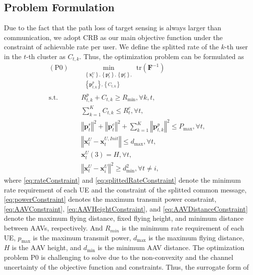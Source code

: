 \documentclass[twocolumn,journal]{IEEEtran}
\begin{document}
\subsection{Problem Formulation}
Due to the fact that the path loss of target sensing is always larger than communication, we adopt CRB as our main objective function under the constraint of achievable rate per user. We define the splitted rate of the \(k\)-th user in the \(t\)-th cluster as \(C_{t,k}\). Thus, the optimization problem can be formulated as
\begin{subequations}
\begin{align}
 (\text{P0})\quad&\min_{
 \substack{\left\{\boldsymbol{x}^{U}_{t}\right\},\left\{\boldsymbol{p}^{r}_{t}\right\},\left\{\boldsymbol{p}^{c}_{t}\right\},\\
 \left\{\boldsymbol{p}^{p}_{t,k}\right\},\left\{C_{t,k}
 \right\}}
 } \text{tr}(\mathbf{F}^{-1})\label{eq:obj}\\
 \text{s.t.}\quad& R^{p}_{t,k} + C_{t,k} \geq R_{\min}, \forall k,t,\label{eq:rateConstraint}\\
    & \sum_{k=1}^{K} C_{t,k} \leq R^{c}_{t}, \forall t, \label{eq:splittedRateConstraint}\\
    & \left\Vert\boldsymbol{p}^{r}_{t}\right\Vert^2 + \left\Vert \boldsymbol{p}^{c}_{t}\right\Vert^2 + \sum_{k=1}^{K} \left\Vert\boldsymbol{p}^{p}_{t,k}\right\Vert^2 \leq P_{\max}, \forall t, \label{eq:powerConstraint}\\
    & \left\Vert \boldsymbol{x}^{U}_{t} - \boldsymbol{x}^{U,Init}_{t}\right\Vert \leq d_{\max}, \forall t, \label{eq:AAVConstraint}\\
    & \boldsymbol{x}^{U}_{t}(3) = H, \forall t, \label{eq:AAVHeightConstraint}\\
    & \left\Vert \boldsymbol{x}^{U}_{t} - \boldsymbol{x}^{U}_{i} \right\Vert^2 \geq d^2_{\min}, \forall t\neq i, \label{eq:AAVDistanceConstraint}
\end{align}
\end{subequations}
where \eqref{eq:rateConstraint} and \eqref{eq:splittedRateConstraint} denote the minimum rate requirement of each UE and the constraint of the splitted common message, \eqref{eq:powerConstraint} denotes the maximum transmit power constraint, \eqref{eq:AAVConstraint}, \eqref{eq:AAVHeightConstraint}, and \eqref{eq:AAVDistanceConstraint} denote the maximum flying distance, fixed flying height, and minimum distance between AAVs, respectively. And \(R_{min}\) is the minimum rate requirement of each UE, \(p_{\max}\) is the maximum transmit power, \(d_{\max}\) is the maximum flying distance, \(H\) is the AAV height, and \(d_{\min}\) is the minimum AAV distance. The optimization problem P0 is challenging to solve due to the non-convexity and the channel uncertainty of the objective function and constraints. Thus, the surrogate form of 
\end{document}
